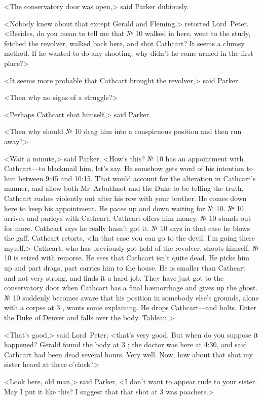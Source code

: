 <The conservatory door was open,> said Parker dubiously.

<Nobody knew about that except Gerald and Fleming,> retorted Lord~Peter. <Besides, do you mean to tell me that № 10 walked in here, went to the study, fetched the revolver, walked back here, and shot Cathcart? It seems a clumsy method. If he wanted to do any shooting, why didn't he come armed in the first place?>

<It seems more probable that Cathcart brought the revolver,> said Parker.

<Then why no signs of a struggle?>

<Perhaps Cathcart shot himself,> said Parker.

<Then why should № 10 drag him into a conspicuous position and then run away?>

<Wait a minute,> said Parker. <How's this? № 10 has an appointment with Cathcart—to blackmail him, let's say. He somehow gets word of his intention to him between 9:45 and 10:15. That would account for the alteration in Cathcart's manner, and allow both Mr~Arbuthnot and the Duke to be telling the truth. Cathcart rushes violently out after his row with your brother. He comes down here to keep his appointment. He paces up and down waiting for № 10. № 10 arrives and parleys with Cathcart. Cathcart offers him money. № 10 stands out for more. Cathcart says he really hasn't got it. № 10 says in that case he blows the gaff. Cathcart retorts, <In that case you can go to the devil. I'm going there myself.> Cathcart, who has previously got hold of the revolver, shoots himself. № 10 is seized with remorse. He sees that Cathcart isn't quite dead. He picks him up and part drags, part carries him to the house. He is smaller than Cathcart and not very strong, and finds it a hard job. They have just got to the conservatory door when Cathcart has a final hæmorrhage and gives up the ghost. № 10 suddenly becomes aware that his position in somebody else's grounds, alone with a corpse at 3 , wants some explaining. He drops Cathcart—and bolts. Enter the Duke of Denver and falls over the body. Tableau.>

<That's good,> said Lord~Peter; <that's very good. But when do you suppose it happened? Gerald found the body at 3 ; the doctor was here at 4:30, and said Cathcart had been dead several hours. Very well. Now, how about that shot my sister heard at three o'clock?>

<Look here, old man,> said Parker, <I don't want to appear rude to your sister. May I put it like this? I suggest that that shot at 3  was poachers.>


